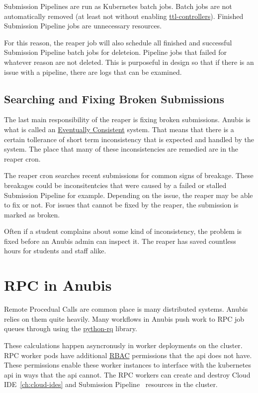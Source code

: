 Submission Pipelines are run as Kubernetes batch jobs.
Batch jobs are not automatically removed (at least not without enabling
\href{https://kubernetes.io/docs/concepts/workloads/controllers/ttlafterfinished/}{ttl-controllers}).
Finished Submission Pipeline jobs are unnecessary resources.

For this reason, the reaper job will also schedule all finished and successful Submission Pipeline batch jobs
for deleteion.
Pipeline jobs that failed for whatever reason are not deleted.
This is purposeful in design so that if there is an issue with a pipeline,
there are logs that can be examined.

\subsection{Searching and Fixing Broken Submissions}\label{subsec:reaping-fixing}

The last main responsibility of the reaper is fixing broken submissions.
Anubis is what is called an \href{https://en.wikipedia.org/wiki/Eventual_consistency}{Eventually Consistent}
system.
That means that there is a certain tollerance of short term inconsistency that is expected
and handled by the system.
The place that many of these inconsistencies are remedied are in the reaper cron.

The reaper cron searches recent submissions for common signs of breakage.
These breakages could be inconsitentcies that were caused by a failed or stalled Submission Pipeline
for example.
Depending on the issue, the reaper may be able to fix or not.
For issues that cannot be fixed by the reaper, the submission is marked as broken.

Often if a student complains about some kind of inconsistency, the problem is fixed
before an Anubis admin can inspect it.
The reaper has saved countless hours for students and staff alike.

\section{RPC in Anubis}\label{sec:rpc-in-anubis}

Remote Procedual Calls are common place is many distributed systems.
Anubis relies on them quite heavily.
Many workflows in Anubis push work to RPC job queues through using the
\href{https://python-rq.org}{python-rq} library.

These calculations happen asyncronusly in worker deployments on the cluster.
RPC worker pods have additional \href{https://kubernetes.io/docs/reference/access-authn-authz/rbac/}{RBAC}
permissions that the api does not have.
These permissions enable these worker instances to interface with the kubernetes api in ways
that the api cannot.
The RPC workers can create and destroy Cloud IDE~\ref{ch:cloud-ides}
and Submission Pipeline~ resources in the cluster.

